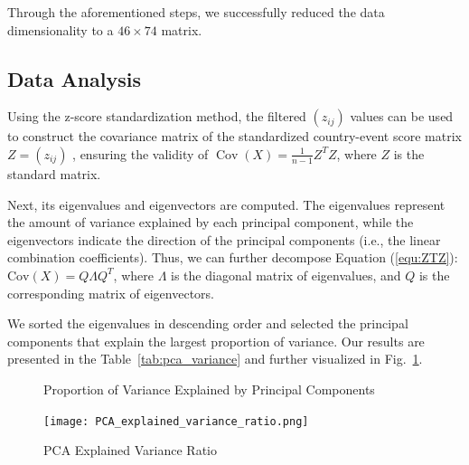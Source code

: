 \documentclass{mcmthesis}
\begin{document}
Through the aforementioned steps, we successfully reduced the data dimensionality to a $46 \times 74$ matrix.

\subsection{Data Analysis}
Using the z-score standardization method, the filtered $(z_{ij})$ values can be used to construct the covariance matrix of the standardized country-event score matrix $Z = (z_{ij})$ , ensuring the validity of \(\operatorname{Cov}(X) = \frac{1}{n-1} Z^T Z\), where $Z$ is the standard matrix.

Next, its eigenvalues and eigenvectors are computed. The eigenvalues represent the amount of variance explained by each principal component, while the eigenvectors indicate the direction of the principal components (i.e., the linear combination coefficients). 
Thus, we can further decompose Equation (\ref{equ:ZTZ}):\(\text{Cov}(X) = Q \Lambda Q^T\), where \( \Lambda \) is the diagonal matrix of eigenvalues, and \( Q \) is the corresponding matrix of eigenvectors.

We sorted the eigenvalues in descending order and selected the principal components that explain the largest proportion of variance. Our results are presented in the Table~\ref{tab:pca_variance} and further visualized in Fig.~\ref{fig:PCA_explained_variance_ratio}.

\begin{figure}[h!]
    \centering
    \begin{minipage}{0.35\textwidth}
        \centering
        \caption{Proportion of Variance Explained by Principal Components}
        \label{tab:pca_variance}
    \end{minipage}
    \hfill
    \begin{minipage}{0.35\textwidth}
        \centering
        \texttt{[image: PCA\_explained\_variance\_ratio.png]}
        \caption{PCA Explained Variance Ratio}
        \label{fig:PCA_explained_variance_ratio}
    \end{minipage}
\end{figure}
\end{document}
